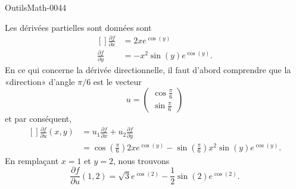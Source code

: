 
\begin{corrige}{OutilsMath-0044}

    Les dérivées partielles sont données sont
    \begin{equation}
        \begin{aligned}[]
            \frac{ \partial f }{ \partial x }&=2x e^{\cos(y)}\\
            \frac{ \partial f }{ \partial y }&=-x^2\sin(y) e^{\cos(y)}.
        \end{aligned}
    \end{equation}
    En ce qui concerne la dérivée directionnelle, il faut d'abord comprendre que la «direction» d'angle $\pi/6$ est le vecteur
    \begin{equation}
        u=\begin{pmatrix}
            \cos\frac{ \pi }{ 6 }    \\ 
            \sin\frac{ \pi }{ 6 }    
        \end{pmatrix}
    \end{equation}
    et par conséquent,
    \begin{equation}
        \begin{aligned}[]
            \frac{ \partial f }{ \partial u }(x,y)&=u_1\frac{ \partial f }{ \partial x }+u_2\frac{ \partial f }{ \partial y }\\
            &=\cos\left( \frac{ \pi }{ 6 } \right)2x e^{\cos(y)}-\sin\left( \frac{ \pi }{ 6 } \right)x^2\sin(y) e^{\cos(y)}.
        \end{aligned}
    \end{equation}
    En remplaçant $x=1$ et $y=2$, nous trouvons
    \begin{equation}
        \frac{ \partial f }{ \partial u }(1,2)=\sqrt{3} e^{\cos(2)}-\frac{1}{ 2 }\sin(2) e^{\cos(2)}.
    \end{equation}

\end{corrige}
